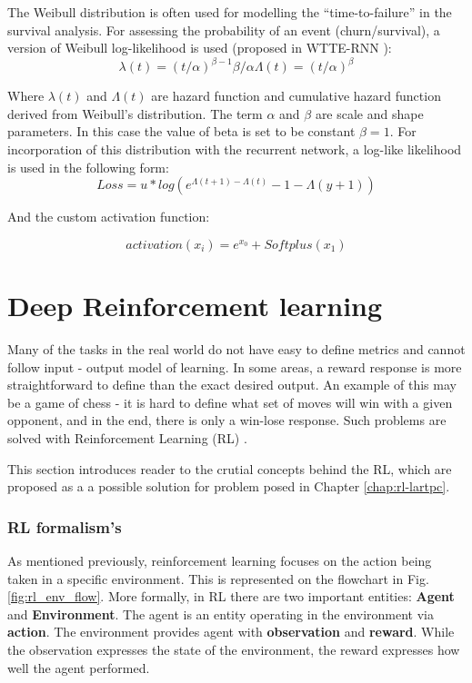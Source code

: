The Weibull distribution is often used for modelling the ``time-to-failure'' in the survival analysis.
For assessing the probability of an event (churn/survival), a version of Weibull log-likelihood is used (proposed in WTTE-RNN \cite{martinsson:Thesis:2016}):
\begin{equation}
    \lambda(t) = (t/\alpha)^{\beta-1}\beta/\alpha
\Lambda(t) = (t/\alpha)^{\beta}
\end{equation}


Where $\lambda(t)$ and $\Lambda(t)$ are hazard function and cumulative hazard function derived from Weibull's distribution.
The term $\alpha$ and $\beta$ are scale and shape parameters. In this case the value of beta is set to be constant $\beta = 1$.
For incorporation of this distribution with the recurrent network, a log-like likelihood is used in the following form:
$$
Loss = u * log(e^{\Lambda(t+1)-\Lambda(t)}-1 - \Lambda(y+1))
$$

And the custom activation function:

\begin{equation}
    activation(x_{i}) = e^{x_{0}} + Softplus(x_{1})
    \label{math:acti}
\end{equation}

\section{Deep Reinforcement learning}

Many of the tasks in the real world do not have easy to define metrics and cannot follow input - output model of learning.
In some areas, a reward response is more straightforward to define than the exact desired output.
An example of this may be a game of chess - it is hard to define what set of moves will win with a given opponent, and in the end, there is only a win-lose response.
Such problems are solved with Reinforcement Learning (RL) \cite{Lapan18}.

This section introduces reader to the crutial concepts behind the RL, which are proposed as a a possible solution for problem posed in Chapter \ref{chap:rl-lartpc}.

\subsubsection{RL formalism's}
\label{sec:rl_mdp}

As mentioned previously, reinforcement learning focuses on the action being taken in a specific environment.
This is represented on the flowchart in Fig. \ref{fig:rl_env_flow}.
More formally, in RL there are two important entities: \textbf{Agent} and \textbf{Environment}.
The agent is an entity operating in the environment via \textbf{action}.
The environment provides agent with \textbf{observation} and \textbf{reward}.
While the observation expresses the state of the environment, the reward expresses how well the agent performed.


